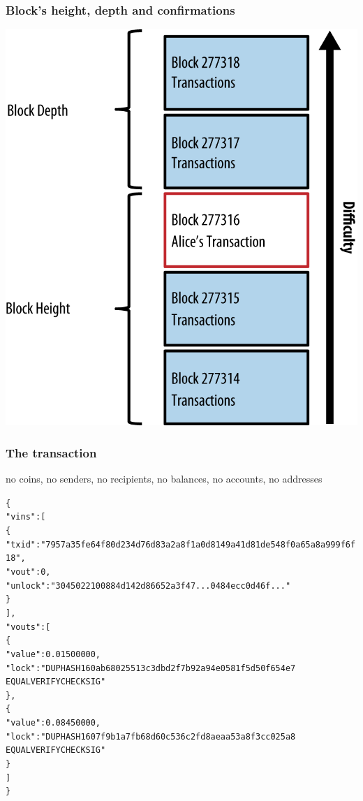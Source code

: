 \documentclass[11pt]{beamer}  %
\begin{document}
\begin{frame}\frametitle{Block's height, depth and confirmations}

  \begin{center}
    \includegraphics[scale=1,clip=false]{pictures/mbc2_0209.png}
  \end{center}

\end{frame}

\begin{frame}[fragile]\frametitle{The transaction}

  \begin{center}
    no coins, no senders, no recipients, no balances, no accounts, no addresses
  \end{center}

  {\scriptsize\begin{alltt}
\{
  "vins": [
    \{
      "txid": "7957a35fe64f80d234d76d83a2a8f1a0d8149a41d81de548f0a65a8a999f6f18",
      "vout": 0,
      "unlock": "3045022100884d142d86652a3f47... 0484ecc0d46f..."
    \}
  ],
  "vouts": [
    \{
      "value": 0.01500000,
      "lock": "DUP HASH160 ab68025513c3dbd2f7b92a94e0581f5d50f654e7 
               EQUALVERIFY CHECKSIG"
    \},
    \{
      "value": 0.08450000,
      "lock": "DUP HASH160 7f9b1a7fb68d60c536c2fd8aeaa53a8f3cc025a8
               EQUALVERIFY CHECKSIG"
    \}
  ]
\}
\end{alltt}}

\end{frame}
\end{document}
